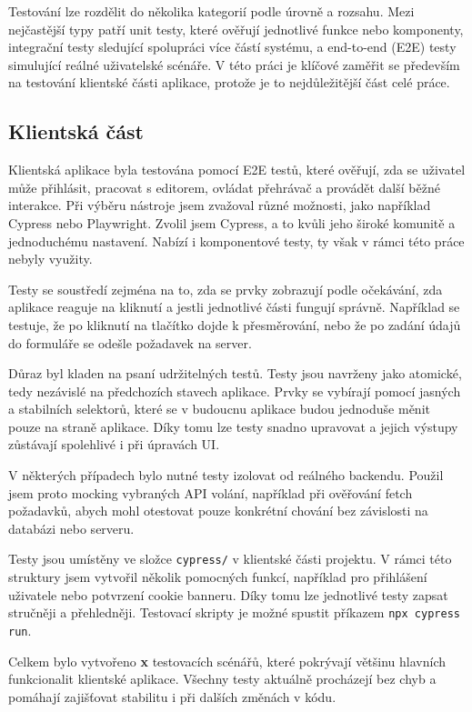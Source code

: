 Testování lze rozdělit do několika kategorií podle úrovně a rozsahu. 
Mezi nejčastější typy patří unit testy, které ověřují jednotlivé funkce nebo komponenty, integrační testy sledující spolupráci více částí systému, a end-to-end (E2E) testy simulující reálné uživatelské scénáře. 
V této práci je klíčové zaměřit se především na testování klientské části aplikace, protože je to nejdůležitější část celé práce.

\subsection{Klientská část}

Klientská aplikace byla testována pomocí E2E testů, které ověřují, zda se uživatel může přihlásit, pracovat s editorem, ovládat přehrávač a provádět další běžné interakce. 
Při výběru nástroje jsem zvažoval různé možnosti, jako například Cypress nebo Playwright. 
Zvolil jsem Cypress, a to kvůli jeho široké komunitě a jednoduchému nastavení.
Nabízí i komponentové testy, ty však v rámci této práce nebyly využity.

Testy se soustředí zejména na to, zda se prvky zobrazují podle očekávání, zda aplikace reaguje na kliknutí a jestli jednotlivé části fungují správně.
Například se testuje, že po kliknutí na tlačítko dojde k přesměrování, nebo že po zadání údajů do formuláře se odešle požadavek na server.

Důraz byl kladen na psaní udržitelných testů. 
Testy jsou navrženy jako atomické, tedy nezávislé na předchozích stavech aplikace. 
Prvky se vybírají pomocí jasných a stabilních selektorů, které se v budoucnu aplikace budou jednoduše měnit pouze na straně aplikace.
Díky tomu lze testy snadno upravovat a jejich výstupy zůstávají spolehlivé i při úpravách UI.

V některých případech bylo nutné testy izolovat od reálného backendu.
Použil jsem proto mocking vybraných API volání, například při ověřování fetch požadavků, abych mohl otestovat pouze konkrétní chování bez závislosti na databázi nebo serveru.

Testy jsou umístěny ve složce \texttt{cypress/} v klientské části projektu. 
V rámci této struktury jsem vytvořil několik pomocných funkcí, například pro přihlášení uživatele nebo potvrzení cookie banneru. 
Díky tomu lze jednotlivé testy zapsat stručněji a přehledněji.
Testovací skripty je možné spustit příkazem \verb|npx cypress run|.

Celkem bylo vytvořeno \textbf{x} testovacích scénářů, které pokrývají většinu hlavních funkcionalit klientské aplikace. 
Všechny testy aktuálně procházejí bez chyb a pomáhají zajišťovat stabilitu i při dalších změnách v kódu.


